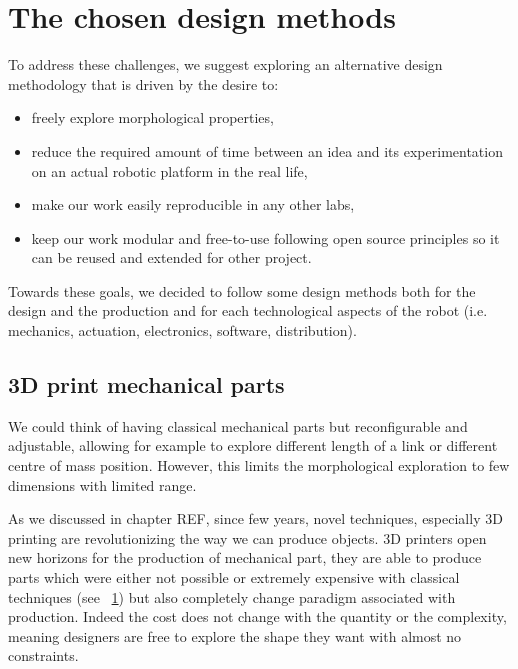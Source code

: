 \section{The chosen design methods} %

To address these challenges, we suggest exploring an alternative design methodology that is driven by the desire to:
\begin{itemize}
    \item freely explore morphological properties,
    \item reduce the required amount of time between an idea and its experimentation on an actual robotic platform in the real life,
    \item make our work easily reproducible in any other labs,
    \item keep our work modular and free-to-use following open source principles so it can be reused and extended for other project.
\end{itemize}


Towards these goals, we decided to follow some design methods both for the design and the production and for each technological aspects of the robot (i.e. mechanics, actuation, electronics, software, distribution).

\subsection{3D print mechanical parts} %
We could think of having classical mechanical parts but reconfigurable and adjustable, allowing for example to explore different length of a link or different centre of mass position. However, this limits the morphological exploration to few dimensions with limited range.

As we discussed in chapter REF, since few years, novel techniques, especially 3D printing are revolutionizing the way we can produce objects. 3D printers open new horizons for the production of mechanical part, they are able to produce parts which were either not possible or extremely expensive with classical techniques (see \figurename~\ref{fig:complex_3D_printed_part}) but also completely change paradigm associated with production. Indeed the cost does not change with the quantity or the complexity, meaning designers are free to explore the shape they want with almost no constraints.

\begin{figure}[tb]
\centering
    \hfil
    \caption{}
    \label{fig:complex_3D_printed_part}
\end{figure}


